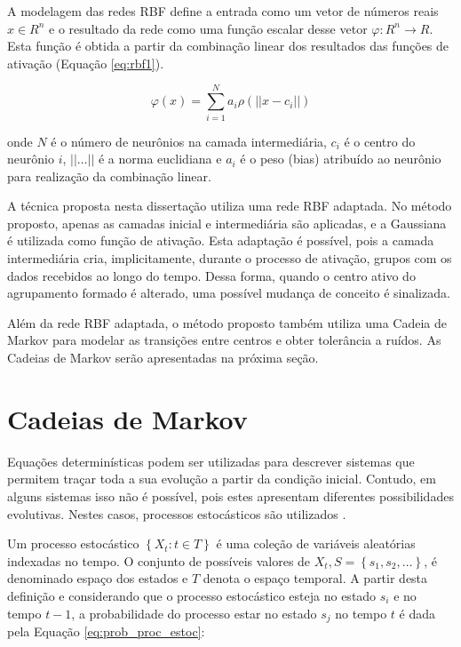 \documentclass[msc, classic, a4paper]{ufbathesis}
\begin{document}
A modelagem das redes RBF define a entrada como um vetor de números reais ${x} \in {R} ^{n}$ e o resultado da rede como uma função escalar desse vetor $\varphi : {R} ^{n} \to {R}$.
Esta função é obtida a partir da combinação linear dos resultados das funções de ativação (Equação \ref{eq:rbf1}).

\begin{equation} \label{eq:rbf1}
    \varphi ({x})=\sum _{{i=1}}^{N}a_{i}\rho (||{x}-{c}_{i}||)
\end{equation}

onde $N$ é o número de neurônios na camada intermediária, ${c}_{i}$ é o centro do neurônio $i$, $||\ldots||$ é a norma euclidiana e $a_{i}$ é o peso (bias) atribuído ao neurônio para realização da combinação linear.

A técnica proposta nesta dissertação utiliza uma rede RBF adaptada.
No método proposto, apenas as camadas inicial e intermediária são aplicadas, e a Gaussiana é utilizada como função de ativação.
Esta adaptação é possível, pois a camada intermediária cria, implicitamente, durante o processo de ativação, grupos com os dados recebidos ao longo do tempo.
Dessa forma, quando o centro ativo do agrupamento formado é alterado, uma possível mudança de conceito é sinalizada.

Além da rede RBF adaptada, o método proposto também utiliza uma Cadeia de Markov para modelar as transições entre centros e obter tolerância a ruídos.
As Cadeias de Markov serão apresentadas na próxima seção.

\section{Cadeias de Markov}

Equações determinísticas podem ser utilizadas para descrever sistemas que permitem traçar toda a sua evolução a partir da condição inicial.
Contudo, em alguns sistemas isso não é possível, pois estes apresentam diferentes possibilidades evolutivas.
Nestes casos, processos estocásticos são utilizados \cite{taylor1998introduction}.

Um processo estocástico $\left\{ X _ { t } : t \in T \right\}$ é uma coleção de variáveis aleatórias indexadas no tempo.
O conjunto de possíveis valores de $X_{t}, S = \left\{s_{1}, s_{2}, \ldots\right\}$, é denominado espaço dos estados e $T$ denota o espaço temporal.
A partir desta definição e considerando que o processo estocástico esteja no estado $s_i$ e no tempo $t - 1$, a probabilidade
do processo estar no estado $s_j$ no tempo $t$ é dada pela Equação \ref{eq:prob_proc_estoc}:
\end{document}
